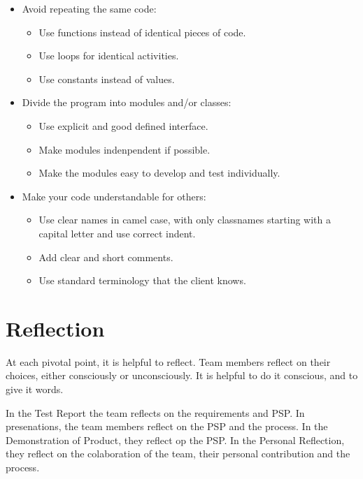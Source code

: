\documentclass[10pt]{report}
\begin{document}
\begin{itemize}
	\item Avoid repeating the same code:
	\begin{itemize}
		\item Use functions instead of identical pieces of code.
		\item Use loops for identical activities.
		\item Use constants instead of values.
	\end{itemize}
	
	\item Divide the program into modules and/or classes:
	\begin{itemize}
		\item Use explicit and good defined interface.
		\item Make modules indenpendent if possible.
		\item Make the modules easy to develop and test individually.
	\end{itemize}
	
	\item Make your code understandable for others:
	\begin{itemize}
		\item Use clear names in camel case, with only classnames starting with a capital letter and use correct indent.
		\item Add clear and short comments.
		\item Use standard terminology that the client knows.
	\end{itemize}
	
\end{itemize}

\newpage

\chapter{Reflection}
\thispagestyle{fancy}

At each pivotal point, it is helpful to reflect. Team members reflect on their choices, either consciously or unconsciously. It is helpful to do it conscious, and to give it words.

In the Test Report the team reflects on the requirements and PSP. In presenations, the team members reflect on the PSP and the process. In the Demonstration of Product, they reflect op the PSP. In the Personal Reflection, they reflect on the colaboration of the team, their personal contribution and the process.
\end{document}
